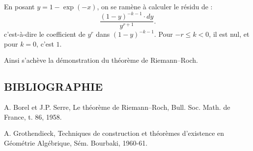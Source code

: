 
En
posant \(y=1-\exp(-x)\), on se ramène à calculer le résidu de :
\[
 \frac{(1-y)^{-k-1}\cdot dy}{y^{r+1}}.
\]
c'est-à-dire le coefficient de \(y^r\) dans \((1-y)^{-k-1}\). Pour \(-r\leq k<0\), il est nul, et pour \(k=0\), c'est \(1\).

Ainsi s'achève la démonstration du théorème de Riemann--Roch.

\subsection*{BIBLIOGRAPHIE}
\begin{enumerate}[label={[\arabic*]}]
\item A. Borel et J.P. Serre, Le théorème de Riemann--Roch, Bull. Soc. Math. de France, t. 86, 1958.
\item A. Grothendieck, Techniques de construction et théorèmes d'existence en Géométrie Algébrique, Sém. Bourbaki, 1960-61.
\end{enumerate}




